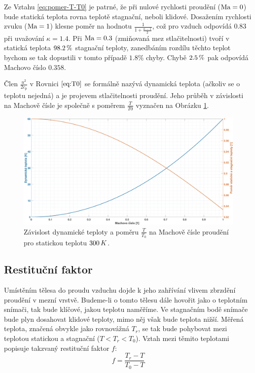     Ze Vztahu \ref{eq:pomer-T-T0} je patrné, že při nulové rychlosti proudění ($\textrm{Ma} = 0$) bude statická teplota rovna teplotě stagnační, neboli klidové. Dosažením rychlosti zvuku ($\textrm{Ma} = 1$) klesne poměr na hodnotu $\frac{1}{1+\frac{\kappa - 1}{2}}$, což pro vzduch odpovídá $0.83$ při uvažování $\kappa = 1.4$. Při $\textrm{Ma} = 0.3$ (zmiňovaná mez stlačitelnosti) tvoří v statická teplota $98.2 \, \%$ stagnační teploty, zanedbáním rozdílu těchto teplot bychom se tak dopustili v tomto případě $1.8\%$ chyby. Chybě $2.5 \, \%$ pak odpovídá Machovo číslo $0.358$.

    \clearpage

    Člen $\frac{u^2}{2 c_p}$ v Rovnici $\ref{eq:T0}$ se formálně nazývá dynamická teplota (ačkoliv se o teplotu nejedná) a je projevem stlačitelnosti proudění. Jeho průběh v závislosti na Machově čísle je společně s poměrem $\frac{T}{T0}$ vyznačen na Obrázku \ref{fig:pomer-T-T0}.

    \begin{figure}[ht!]
        \centering
        \includegraphics[width=\textwidth]{100_MERENI_TEPLOT/pomer_T_T0.eps}
        \caption{Závislost dynamické teploty a poměru $\frac{T}{T_0}$ na Machově čísle proudění pro statickou teplotu $300 \, K$.}
        \label{fig:pomer-T-T0}
    \end{figure}

    \subsection{Restituční faktor}

    Umístěním tělesa do proudu vzduchu dojde k jeho zahřívání vlivem zbrzdění proudění v mezní vrstvě. Budeme-li o tomto tělesu dále hovořit jako o teplotním snímači, tak bude klíčové, jakou teplotu naměříme. Ve stagnačním bodě snímače bude plyn dosahovat klidové teploty, mimo něj však bude teplota nižší. Měřená teplota, značená obvykle jako rovnovážná $T_r$, se tak bude pohybovat mezi teplotou statickou a stagnační ($T < T_r < T_0$). Vztah mezi těmito teplotami popisuje takzvaný restituční faktor $f$:
    \begin{equation} \label{eq:restitucni-faktor}
        f = \frac{T_r - T}{T_0 - T}
    \end{equation}

